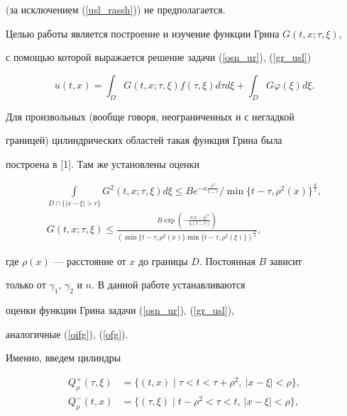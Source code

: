 (за исключением (\ref{usl_rassh})) не предполагается.





Целью работы является построение и изучение функции Грина $G(t,x;\tau,\xi)$,


с помощью которой выражается решение задачи (\ref{osn_ur}), (\ref{gr_usl})


\begin{equation}


\label{ressh} 


u(t,x)=\int_\Omega G(t,x;\tau,\xi)f(\tau,\xi)d\tau d\xi+


\int_D G \varphi(\xi)d\xi.


\end{equation} 


Для произвольных (вообще говоря, неограниченных и с негладкой


границей) цилиндрических областей такая функция Грина была


построена в [1]. Там же установлены оценки


\begin{gather}


\int\limits_{D\cap\{ |x-\xi|>r\}} \!\!G^2 (t,x;\tau,\xi)d\xi \leq


B e^{-\kappa \frac{r^2}{t-\tau}}/\min \{ t-\tau,\rho^2(x)\}^{\frac{n}{2}},


\label{oifg} \\


%


G(t,x;\tau,\xi) \leq 


\frac{B \exp\left(-\frac{\kappa |x-\xi|^2}{4(t-\tau) }\right)}


{(\min\{t-\tau,\rho^2(x) \}


\min\{t-\tau,\rho^2(\xi)\} )^{\frac{n}{4}} },


\label{ofg}


\end{gather}


где $\rho(x)$ --- расстояние от $x$ до границы $D$. Постоянная $B$ зависит


только от $\gamma_1$, $\gamma_2$ и $n$. В данной работе устанавливаются 


оценки функции Грина задачи (\ref{osn_ur}), (\ref{gr_usl}),


аналогичные (\ref{oifg}), (\ref{ofg}). 


Именно, введем цилиндры


\begin{align*}


Q_\rho^+(\tau,\xi)&=\{ (t,x)\mid\tau<t<\tau+\rho^2,\ |x-\xi|<\rho\},\\


Q_\rho^-(t,x)&=\{ (\tau,\xi)\mid t-\rho^2<\tau<t,\ |x-\xi|<\rho\},


\end{align*} 



